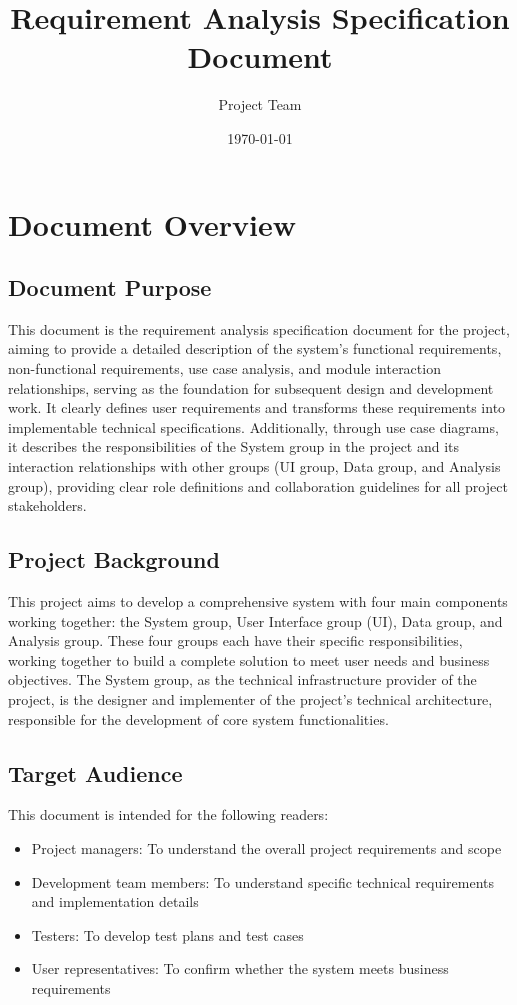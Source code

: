 \documentclass[a4paper,12pt]{article}
\title{Requirement Analysis Specification Document}
\author{Project Team}
\date{\today}
\begin{document}
\maketitle
\tableofcontents
\newpage

\section{Document Overview}

\subsection{Document Purpose}

This document is the requirement analysis specification document for the project, aiming to provide a detailed description of the system's functional requirements, non-functional requirements, use case analysis, and module interaction relationships, serving as the foundation for subsequent design and development work. It clearly defines user requirements and transforms these requirements into implementable technical specifications. Additionally, through use case diagrams, it describes the responsibilities of the System group in the project and its interaction relationships with other groups (UI group, Data group, and Analysis group), providing clear role definitions and collaboration guidelines for all project stakeholders.

\subsection{Project Background}

This project aims to develop a comprehensive system with four main components working together: the System group, User Interface group (UI), Data group, and Analysis group. These four groups each have their specific responsibilities, working together to build a complete solution to meet user needs and business objectives. The System group, as the technical infrastructure provider of the project, is the designer and implementer of the project's technical architecture, responsible for the development of core system functionalities.

\subsection{Target Audience}

This document is intended for the following readers:
\begin{itemize}
  \item Project managers: To understand the overall project requirements and scope
  \item Development team members: To understand specific technical requirements and implementation details
  \item Testers: To develop test plans and test cases
  \item User representatives: To confirm whether the system meets business requirements
\end{itemize}
\end{document}
